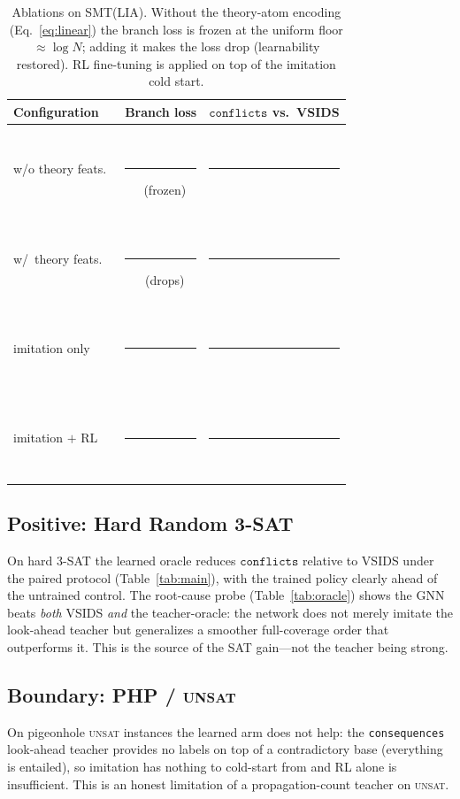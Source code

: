 \documentclass[letterpaper]{article} %
\theoremstyle{definition}
\theoremstyle{plain}
\theoremstyle{remark}
\newcommand{\blank}{\,\rule[-.1ex]{2.2em}{0.4pt}\,} %
\newcommand{\confl}{\texttt{conflicts}}
\begin{document}
\begin{table}[t]
\centering
\small
\begin{tabular}{@{}lcc@{}}
\toprule
Configuration & Branch loss & $\confl$ vs.\ VSIDS \\
\midrule
w/o theory feats.\  & \blank\ (frozen) & \blank \\
w/\ theory feats.\  & \blank\ (drops)  & \blank \\
imitation only      & \blank & \blank \\
imitation $+$ RL    & \blank & \blank \\
\bottomrule
\end{tabular}
\caption{Ablations on SMT(LIA). Without the theory-atom encoding
(Eq.~\ref{eq:linear}) the branch loss is frozen at the uniform floor
$\approx\!\log N$; adding it makes the loss drop (learnability restored). RL
fine-tuning is applied on top of the imitation cold start.}
\label{tab:ablation}
\end{table}

\subsection{Positive: Hard Random 3-SAT}
On hard 3-SAT the learned oracle reduces $\confl$ relative to VSIDS under the
paired protocol (Table~\ref{tab:main}), with the trained policy clearly
ahead of the untrained control. The root-cause probe
(Table~\ref{tab:oracle}) shows the GNN beats \emph{both} VSIDS \emph{and} the
teacher-oracle: the network does not merely imitate the look-ahead teacher
but generalizes a smoother full-coverage order that outperforms it. This is
the source of the SAT gain---not the teacher being strong.

\subsection{Boundary: PHP / \textsc{unsat}}
On pigeonhole \textsc{unsat} instances the learned arm does not help: the
\texttt{consequences} look-ahead teacher provides no labels on top of a
contradictory base (everything is entailed), so imitation has nothing to
cold-start from and RL alone is insufficient. This is an honest limitation of
a propagation-count teacher on \textsc{unsat}.
\end{document}
